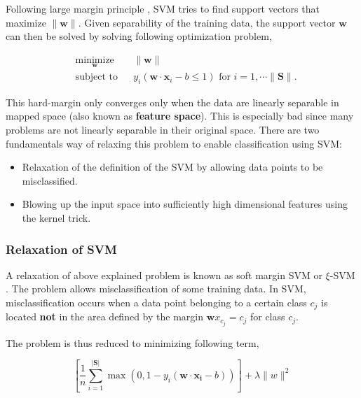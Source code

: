 \documentclass[pdftex,12pt,a4paper]{report}
\begin{document}
Following large margin principle \cite{vapnik1964note, murphy2012machine}, SVM tries to find support vectors that maximize $\| \mathbf{w} \|$. Given separability of the training data, the support vector $\mathbf{w}$ can then be solved by solving following optimization problem, 

\begin{equation*}
\begin{aligned}
& \underset{\mathbf{
w}}{\text{minimize}}
& & \| \mathbf{w}\| \\
& \text{subject to}
& & y_i(\mathbf{w} \cdot \mathbf{x}_i - b \leq 1) \text{ for } i = 1, \cdots \| \mathbf{S} \|.
\end{aligned}
\label{eq:svm_hard_margin}
\end{equation*}

This hard-margin only converges only when the data are linearly separable in mapped space (also known as \textbf{feature space}). This is especially bad since many problems are not linearly separable in their original space. There are two fundamentals way of relaxing this problem to enable classification using SVM:

\begin{itemize}
\item Relaxation of the definition of the SVM by allowing data points to be misclassified.
\item Blowing up the input space into sufficiently high dimensional features using the kernel trick.
\end{itemize}

\subsubsection*{Relaxation of SVM}

A relaxation of above explained problem is known as soft margin SVM or $\xi$-SVM \cite{cortes1995support}. The problem allows misclassification of some training data. In SVM, misclassification occurs when a data point belonging to a certain class $c_j$ is located \textbf{not} in the area defined by the margin $\mathbf{w} x_{c_j} = c_j$ for class $c_j$.

The problem is thus reduced to minimizing following term,

\begin{equation}
\left[\frac{1}{n} \sum_{i=1}^{\vert \mathbf{S} \vert} \max\left(0, 1 - y_i(\mathbf{w} \cdot \mathbf{x_i} - b)\right) \right] + \lambda\| w \|^2
\label{eq:soft_margin_svm_term}
\end{equation}
\end{document}
